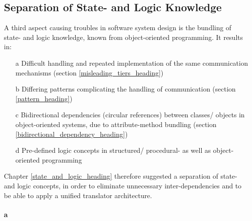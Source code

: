 %
%
%
%
%
%
%

\subsection{Separation of State- and Logic Knowledge}
\label{separation_of_state_and_logic_knowledge_heading}

A third aspect causing troubles in software system design is the bundling of
state- and logic knowledge, known from object-oriented programming. It results
in:

\begin{itemize}
    \item[a] Difficult handling and repeated implementation of the same
        communication mechanisms (section \ref{misleading_tiers_heading})
    \item[b] Differing patterns complicating the handling of communication
        (section \ref{pattern_heading})
    \item[c] Bidirectional dependencies (circular references) between classes/
        objects in object-oriented systems, due to attribute-method bundling
        (section \ref{bidirectional_dependency_heading})
    \item[d] Pre-defined logic concepts in structured/ procedural- as well as
        object-oriented programming
\end{itemize}

Chapter \ref{state_and_logic_heading} therefore suggested a separation of
state- and logic concepts, in order to eliminate unnecessary inter-dependencies
and to be able to apply a unified translator architecture.

\paragraph{a}

